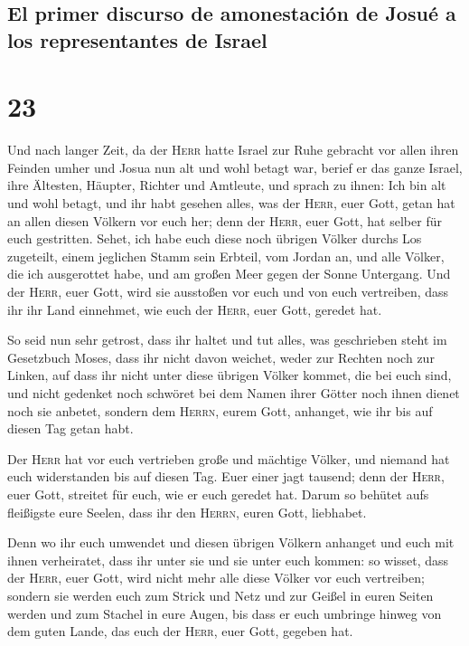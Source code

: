 \hypertarget{el-primer-discurso-de-amonestaciuxf3n-de-josuuxe9-a-los-representantes-de-israel}{%
\subsection{El primer discurso de amonestación de Josué a los
representantes de
Israel}\label{el-primer-discurso-de-amonestaciuxf3n-de-josuuxe9-a-los-representantes-de-israel}}

\hypertarget{section-22}{%
\section{23}\label{section-22}}

 Und nach langer Zeit, da der \textsc{Herr} hatte Israel
zur Ruhe gebracht vor allen ihren Feinden umher und Josua nun alt und
wohl betagt war,  berief er das ganze Israel, ihre
Ältesten, Häupter, Richter und Amtleute, und sprach zu ihnen: Ich bin
alt und wohl betagt,  und ihr habt gesehen alles, was der
\textsc{Herr}, euer Gott, getan hat an allen diesen Völkern vor euch
her; denn der \textsc{Herr}, euer Gott, hat selber für euch gestritten.
 Sehet, ich habe euch diese noch übrigen Völker durchs Los
zugeteilt, einem jeglichen Stamm sein Erbteil, vom Jordan an, und alle
Völker, die ich ausgerottet habe, und am großen Meer gegen der Sonne
Untergang.  Und der \textsc{Herr}, euer Gott, wird sie
ausstoßen vor euch und von euch vertreiben, dass ihr ihr Land einnehmet,
wie euch der \textsc{Herr}, euer Gott, geredet hat.

 So seid nun sehr getrost, dass ihr haltet und tut alles,
was geschrieben steht im Gesetzbuch Moses, dass ihr nicht davon weichet,
weder zur Rechten noch zur Linken,  auf dass ihr nicht
unter diese übrigen Völker kommet, die bei euch sind, und nicht gedenket
noch schwöret bei dem Namen ihrer Götter noch ihnen dienet noch sie
anbetet,  sondern dem \textsc{Herrn}, eurem Gott,
anhanget, wie ihr bis auf diesen Tag getan habt.

 Der \textsc{Herr} hat vor euch vertrieben große und
mächtige Völker, und niemand hat euch widerstanden bis auf diesen Tag.
 Euer einer jagt tausend; denn der \textsc{Herr}, euer
Gott, streitet für euch, wie er euch geredet hat.  Darum
so behütet aufs fleißigste eure Seelen, dass ihr den \textsc{Herrn},
euren Gott, liebhabet.

 Denn wo ihr euch umwendet und diesen übrigen Völkern
anhanget und euch mit ihnen verheiratet, dass ihr unter sie und sie
unter euch kommen:  so wisset, dass der \textsc{Herr},
euer Gott, wird nicht mehr alle diese Völker vor euch vertreiben;
sondern sie werden euch zum Strick und Netz und zur Geißel in euren
Seiten werden und zum Stachel in eure Augen, bis dass er euch umbringe
hinweg von dem guten Lande, das euch der \textsc{Herr}, euer Gott,
gegeben hat.

